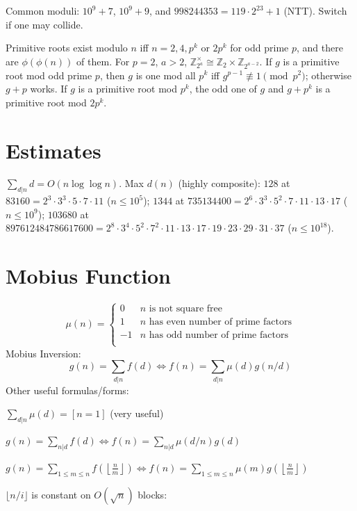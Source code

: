 	Common moduli: $10^9+7$, $10^9+9$, and $998244353=119\cdot 2^{23}+1$ (NTT).
	Switch if one may collide.

	Primitive roots exist modulo $n$ iff $n=2,4,p^k$ or $2p^k$ for odd prime $p$, and there are $\phi(\phi(n))$ of them.
	For $p=2$, $a>2$, $\mathbb Z_{2^a}^\times\cong\mathbb Z_2\times\mathbb Z_{2^{a-2}}$.
	If $g$ is a primitive root mod odd prime $p$, then $g$ is one mod all $p^k$ iff $g^{p-1}\not\equiv 1\pmod{p^2}$; otherwise $g+p$ works.
	If $g$ is a primitive root mod $p^k$, the odd one of $g$ and $g+p^k$ is a primitive root mod $2p^k$.


\section{Estimates}
	$\sum_{d|n} d = O(n \log \log n)$.
	Max $d(n)$ (highly composite): $128$ at $83160=2^3\cdot 3^3\cdot 5\cdot 7\cdot 11$ ($n\le 10^5$);
	$1344$ at $735134400=2^6\cdot 3^3\cdot 5^2\cdot 7\cdot 11\cdot 13\cdot 17$ ($n\le 10^9$);
	$103680$ at $897612484786617600=2^8\cdot 3^4\cdot 5^2\cdot 7^2\cdot 11\cdot 13\cdot 17\cdot 19\cdot 23\cdot 29\cdot 31\cdot 37$ ($n\le 10^{18}$).

\section{Mobius Function}
\[
	\mu(n) = \begin{cases} 0 & n \textrm{ is not square free}\\ 1 & n \textrm{ has even number of prime factors}\\ -1 & n \textrm{ has odd number of prime factors}\\\end{cases}
\]
  Mobius Inversion:
  \[ g(n) = \sum_{d|n} f(d) \Leftrightarrow f(n) = \sum_{d|n} \mu(d)g(n/d) \]
  Other useful formulas/forms:

  $ \sum_{d | n} \mu(d) = [ n = 1] $ (very useful)

  $ g(n) = \sum_{n|d} f(d) \Leftrightarrow f(n) = \sum_{n|d} \mu(d/n)g(d)$

 $ g(n) = \sum_{1 \leq m \leq n} f(\left\lfloor\frac{n}{m}\right \rfloor ) \Leftrightarrow f(n) = \sum_{1\leq m\leq n} \mu(m)g(\left\lfloor\frac{n}{m}\right\rfloor)$

	$\lfloor n/i\rfloor$ is constant on $O(\sqrt n)$ blocks:
